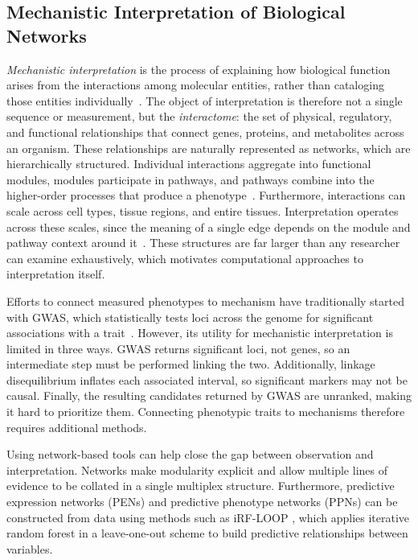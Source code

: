 \subsection{Mechanistic Interpretation of Biological Networks}\label{sec:ch1-llmmech}
\textit{Mechanistic interpretation} is the process of explaining how biological function arises from the interactions among molecular entities, rather than cataloging those entities individually~\cite{hartwell1999molecular, barabasi2004network}. The object of interpretation is therefore not a single sequence or measurement, but the \textit{interactome}: the set of physical, regulatory, and functional relationships that connect genes, proteins, and metabolites across an organism. These relationships are naturally represented as networks, which are hierarchically structured. Individual interactions aggregate into functional modules, modules participate in pathways, and pathways combine into the higher-order processes that produce a phenotype~\cite{barabasi2011network, menche2015uncovering}. Furthermore, interactions can scale across cell types, tissue regions, and entire tissues. Interpretation operates across these scales, since the meaning of a single edge depends on the module and pathway context around it~\cite{ideker2012differential}. These structures are far larger than any researcher can examine exhaustively, which motivates computational approaches to interpretation itself.

Efforts to connect measured phenotypes to mechanism have traditionally started with GWAS, which statistically tests loci across the genome for significant associations with a trait~\cite{uffelmann2021genome}. However, its utility for mechanistic interpretation is limited in three ways. GWAS returns significant loci, not genes, so an intermediate step must be performed linking the two. Additionally, linkage disequilibrium inflates each associated interval, so significant markers may not be causal. Finally, the resulting candidates returned by GWAS are unranked, making it hard to prioritize them. Connecting phenotypic traits to mechanisms therefore requires additional methods.

Using network-based tools can help close the gap between observation and interpretation. Networks make modularity explicit and allow multiple lines of evidence to be collated in a single multiplex structure. Furthermore, predictive expression networks (PENs) and predictive phenotype networks (PPNs) can be constructed from data using methods such as iRF-LOOP \cite{cliff2019high, basu2018iterative}, which applies iterative random forest in a leave-one-out scheme to build predictive relationships between variables.

